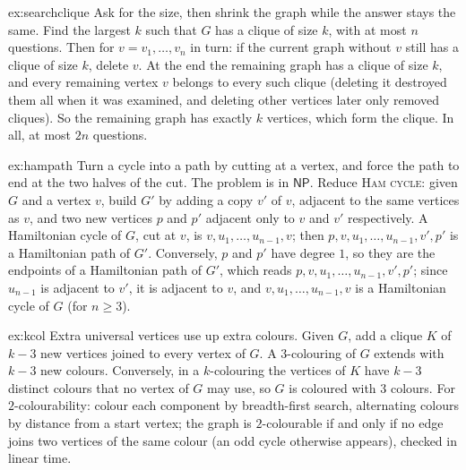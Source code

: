 \begin{solution}{ex:searchclique}
\idea Ask for the size, then shrink the graph while the answer stays the same.
\writeup Find the largest $k$ such that $G$ has a clique of size $k$, with at most $n$ questions. Then for $v=v_1,\dots,v_n$ in turn: if the current graph without $v$ still has a clique of size $k$, delete $v$. At the end the remaining graph has a clique of size $k$, and every remaining vertex $v$ belongs to every such clique (deleting it destroyed them all when it was examined, and deleting other vertices later only removed cliques). So the remaining graph has exactly $k$ vertices, which form the clique. In all, at most $2n$ questions.
\end{solution}

\begin{solution}{ex:hampath}
\idea Turn a cycle into a path by cutting at a vertex, and force the path to end at the two halves of the cut.
\writeup The problem is in $\mathsf{NP}$. Reduce \textup{\textsc{Ham cycle}}: given $G$ and a vertex $v$, build $G'$ by adding a copy $v'$ of $v$, adjacent to the same vertices as $v$, and two new vertices $p$ and $p'$ adjacent only to $v$ and $v'$ respectively. A Hamiltonian cycle of $G$, cut at $v$, is $v,u_1,\dots,u_{n-1},v$; then $p,v,u_1,\dots,u_{n-1},v',p'$ is a Hamiltonian path of $G'$. Conversely, $p$ and $p'$ have degree $1$, so they are the endpoints of a Hamiltonian path of $G'$, which reads $p,v,u_1,\dots,u_{n-1},v',p'$; since $u_{n-1}$ is adjacent to $v'$, it is adjacent to $v$, and $v,u_1,\dots,u_{n-1},v$ is a Hamiltonian cycle of $G$ (for $n\ge3$).
\end{solution}

\begin{solution}{ex:kcol}
\idea Extra universal vertices use up extra colours.
\writeup Given $G$, add a clique $K$ of $k-3$ new vertices joined to every vertex of $G$. A $3$-colouring of $G$ extends with $k-3$ new colours. Conversely, in a $k$-colouring the vertices of $K$ have $k-3$ distinct colours that no vertex of $G$ may use, so $G$ is coloured with $3$ colours. For $2$-colourability: colour each component by breadth-first search, alternating colours by distance from a start vertex; the graph is $2$-colourable if and only if no edge joins two vertices of the same colour (an odd cycle otherwise appears), checked in linear time.
\end{solution}

